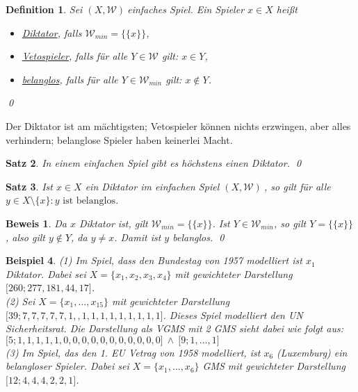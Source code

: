 \documentclass[ngerman]{scrartcl}
\theoremstyle{custom}
\newtheorem{mdef}{Definition} \numberwithin{mdef}{subsection}
\newtheorem{mex}[mdef]{Beispiel}
\newtheorem{ms}[mdef]{Satz}
\newtheorem*{bw}{Beweis}
\newcommand{\0}{\mathbf{0}}
\newcommand{\1}{\mathbf{L}}
\newcommand{\sg}{$(X,\mathcal{W})~$}
\begin{document}
\begin{mdef}
Sei \sg einfaches Spiel. Ein Spieler $x \in X$ hei\ss t
\begin{itemize}
\item[(1)] \underline{Diktator}, falls $\mathcal{W}_{min} =
\{\{x\}\}$,
\item[(2)] \underline{Vetospieler}, falls f\"ur alle $Y \in
  \mathcal{W}$ gilt: $x \in Y$,
\item[(3)] \underline{belanglos}, falls f\"ur alle $Y \in
  \mathcal{W}_{min}$ gilt: $x \not \in Y$.
\end{itemize}
\qed
\end{mdef}

Der Diktator ist am m\"achtigsten; Vetospieler k\"onnen nichts
erzwingen, aber alles verhindern; belanglose Spieler haben keinerlei
Macht.

\begin{ms}
In einem einfachen Spiel gibt es h\"ochstens einen Diktator.
\qed
\end{ms}

\begin{ms}
Ist $x \in X$ ein Diktator im einfachen Spiel \sg, so gilt f\"ur alle
$y \in X \setminus \{x\}: y \text{ ist belanglos}$.
\end{ms}

\begin{bw}
Da $x$ Diktator ist, gilt $\mathcal{W}_{min} = \{\{x\}\}$. Ist $Y \in
\mathcal{W}_{min}$, so gilt $Y = \{\{x\}\}$, also gilt $y
\not \in Y$, da $y \not = x$. Damit ist $y$ belanglos.
\qed
\end{bw}

\begin{mex}
(1) Im Spiel, dass den Bundestag von 1957 modelliert ist $x_1$
Diktator. Dabei sei $X =\{x_1,x_2,x_3,x_4\}$ mit gewichteter
Darstellung $\lbrack 260; 277,181, 44, 17 \rbrack$.\\

(2) Sei $X = \{x_1, \dots, x_15\}$ mit gewichteter Darstellung
$\lbrack 39; 7, 7, 7, 7, 7, 1, ,1 ,1 ,1 ,1, 1, 1, 1, 1, 1
\rbrack$. Dieses Spiel modelliert den UN Sicherheitsrat. Die
Darstellung als VGMS mit 2 GMS sieht dabei wie folgt aus:
$\lbrack 5; 1, 1, 1, 1, 1, 0, 0, 0, 0, 0, 0, 0, 0, 0, 0, 0 \rbrack
~\wedge~ \lbrack 9; 1, \dots, 1\rbrack$\\

(3) Im Spiel, das den 1. EU Vetrag von 1958 modelliert, ist $x_6$
(Luxemburg) ein belangloser Spieler. Dabei sei $X = \{x_1,\dots,x_6\}$
GMS mit gewichteter Darstellung $\lbrack 12; 4, 4, 4, 2, 2, 1\rbrack$.
\end{mex}
\end{document}

